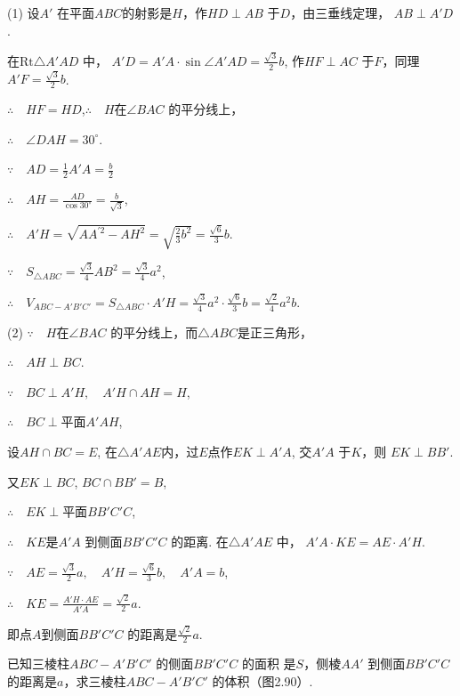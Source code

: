 \begin{solution}
(1) 设$A'$ 在平面$ABC$的射影是$H$，作$HD\perp AB$ 于$D$，由三垂线定理， $AB\perp A'D$.

在$\mathrm{Rt}\triangle A'AD$ 中， $A'D=A'A\cdot \sin\angle A'AD=\frac{\sqrt{3}}{2}b$, 作$HF\perp AC$ 于$F$，同理$A'F=\frac{\sqrt{3}}{2}b$.

$\therefore\quad HF=HD$,\qquad  $\therefore\quad  H$在$\angle BAC$ 的平分线上，

$\therefore\quad \angle DAH=30^{\circ}$.

$\because\quad AD=\frac{1}{2}A'A=\frac{b}{2}$ 

$\therefore\quad AH=\frac{AD}{\cos 30^{\circ}}=\frac{b}{\sqrt{3}}$,

$\therefore\quad A'H=\sqrt{AA^{\prime 2}-AH^{2}}=\sqrt{\frac{2}{3}b^{2}}=\frac{\sqrt{6}}{3}b$.

$\because\quad S_{\triangle ABC}=\frac{\sqrt{3}}{4}AB^{2}=\frac{\sqrt{3}}{4}a^{2}$,

$\therefore\quad V_{ABC-A'B'C'}=S_{\triangle ABC}\cdot A'H=\frac{\sqrt{3}}{4}a^{2}\cdot \frac{\sqrt{6}}{3}b =\frac{\sqrt{2}}{4}a^{2}b$.

(2) $\because\quad  H$在$\angle BAC$ 的平分线上，而$\triangle ABC$是正三角形，

$\therefore\quad AH\perp BC$.

$\because\quad BC\perp A'H,\quad A'H\cap AH=H$,

$\therefore\quad BC\perp \text{平面} A'AH$,

设$AH\cap BC=E$, 
在$\triangle A'AE$内，过$E$点作$EK\perp A'A$, 交$A'A$ 于$K$，则 $EK\perp BB'$. 

又$EK\perp BC$, $BC\cap BB'=B$,  

$\therefore\quad EK\perp \text{平面}  BB'C'C$,  

$\therefore\quad   KE$是$A'A$ 到侧面$BB'C'C$ 的距离. 在$ \triangle A'AE$ 中， $A'A\cdot  KE=AE\cdot  A'H$.

$\because\quad AE=\frac{\sqrt{3}}{2}a,\quad A'H=\frac{\sqrt{6}}{3}b,\quad A'A=b$,

$\therefore\quad KE=\frac{A'H\cdot  AE}{A'A}=\frac{\sqrt{2}}{2}a$.

即点$A$到侧面$BB'C'C$ 的距离是$\frac{\sqrt{2}}{2}a$.
\end{solution}

\begin{example}
    已知三棱柱$ABC-A'B'C'$ 的侧面$BB'C'C$ 的面积
是$S$，侧棱$AA'$ 到侧面$BB'C'C$ 的距离是$a$，求三棱柱$ABC- A'B'C'$ 的体积（图2.90）.
\end{example}

